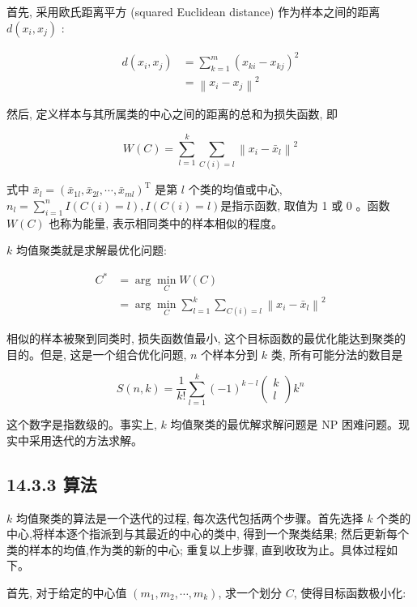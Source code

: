 \documentclass[10pt]{article}
\begin{document}
首先, 采用欧氏距离平方 (squared Euclidean distance) 作为样本之间的距离 $d\left(x_{i}, x_{j}\right)$ :


\begin{align*}
d\left(x_{i}, x_{j}\right) & =\sum_{k=1}^{m}\left(x_{k i}-x_{k j}\right)^{2} \\
& =\left\|x_{i}-x_{j}\right\|^{2} \tag{14.18}
\end{align*}


然后, 定义样本与其所属类的中心之间的距离的总和为损失函数, 即


\begin{equation*}
W(C)=\sum_{l=1}^{k} \sum_{C(i)=l}\left\|x_{i}-\bar{x}_{l}\right\|^{2} \tag{14.19}
\end{equation*}


式中 $\bar{x}_{l}=\left(\bar{x}_{1 l}, \bar{x}_{2 l}, \cdots, \bar{x}_{m l}\right)^{\mathrm{T}}$ 是第 $l$ 个类的均值或中心, $n_{l}=\sum_{i=1}^{n} I(C(i)=l), I(C(i)=l)$是指示函数, 取值为 1 或 0 。函数 $W(C)$ 也称为能量, 表示相同类中的样本相似的程度。

$k$ 均值聚类就是求解最优化问题:


\begin{align*}
C^{*} & =\arg \min _{C} W(C) \\
& =\arg \min _{C} \sum_{l=1}^{k} \sum_{C(i)=l}\left\|x_{i}-\bar{x}_{l}\right\|^{2} \tag{14.20}
\end{align*}


相似的样本被聚到同类时, 损失函数值最小, 这个目标函数的最优化能达到聚类的目的。但是, 这是一个组合优化问题, $n$ 个样本分到 $k$ 类, 所有可能分法的数目是

\[
S(n, k)=\frac{1}{k !} \sum_{l=1}^{k}(-1)^{k-l}\left(\begin{array}{c}
k  \tag{14.21}\\
l
\end{array}\right) k^{n}
\]

这个数字是指数级的。事实上, $k$ 均值聚类的最优解求解问题是 NP 困难问题。现实中采用迭代的方法求解。

\subsection*{14.3.3 算法}
$k$ 均值聚类的算法是一个迭代的过程, 每次迭代包括两个步骤。首先选择 $k$ 个类的中心,将样本逐个指派到与其最近的中心的类中, 得到一个聚类结果; 然后更新每个类的样本的均值,作为类的新的中心; 重复以上步骤, 直到收玫为止。具体过程如下。

首先, 对于给定的中心值 $\left(m_{1}, m_{2}, \cdots, m_{k}\right)$, 求一个划分 $C$, 使得目标函数极小化:
\end{document}
